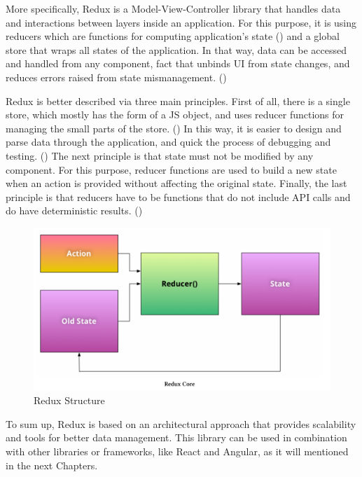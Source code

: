 More specifically, Redux is a Model-View-Controller library that handles data and interactions between layers inside an application. For this purpose, it is using reducers which are functions for computing application's state (\cite{Reference15}) and a global store that wraps all states of the application. In that way, data can be accessed and handled from any component, fact that unbinds UI from state changes, and reduces errors raised from state mismanagement. (\cite{Reference10}) \par

Redux is better described via three main principles. First of all, there is a single store, which mostly has the form of a JS object, and uses reducer functions for managing the small parts of the store. (\cite{Reference13}) In this way, it is easier to design and parse data through the application, and quick the process of debugging and testing. (\cite{Reference17}) The next principle is that state must not be modified by any component. For this purpose, reducer functions are used to build a new state when an action is provided without affecting the original state. Finally, the last principle is that reducers have to be functions that do not include API calls and do have deterministic results. (\cite{Reference13}) \par

\begin{figure}[h!]
	\begin{center}
		\includegraphics[scale=0.35]{images/Redux-Philosophy.png}
	\end{center}
	\caption{Redux Structure}
\end{figure}

To sum up, Redux is based on an architectural approach that provides scalability and tools for better data management. This library can be used in combination with other libraries or frameworks, like React and Angular, as it will mentioned in the next Chapters.

